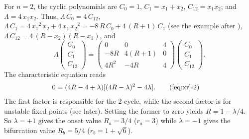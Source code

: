 \documentclass{ws-ijbc}
\begin{document}
For $n = 2$, the cyclic polynomials
  are
$C_0 = 1$,
$C_1 = x_1 + x_2$,
$C_{12} = x_1 x_2$;
and $\Lambda = 4 \, x_1 x_2$.
Thus,
$\Lambda \, C_0 = 4 \, C_{12}$,
$\Lambda \, C_1 = 4 \, {x_1}^2 \, x_2 + 4 \, x_1 \, {x_2}^2
  = -8 \, R \, C_0 + 4 \, (R + 1) \, C_1$
(see the example after ),
$\Lambda \, C_{12}
  = 4 \, (R - x_2) (R - x_1)$,
and
\[
\Lambda
  \left( \begin{array}{c}
  C_0 \\
  C_1 \\
  C_{12}
  \end{array} \right)
 =
  \left( \begin{array}{ccc}
  0           & 0         & 4 \\
  -8R         & 4(R+1)    & 0 \\
  4R^2        & -4R       & 4
  \end{array} \right)
  \left( \begin{array}{c}
  C_0 \\
  C_1 \\
  C_{12}
  \end{array} \right).
\]
%
%
%
The characteristic equation  reads
%
%
%
\begin{align}
0 &= (4R - 4 + \lambda) [(4 R-\lambda)^2 - 4 \lambda].
  \tag{\ref{eq:xr}-2}
\label{eq:xr2}
\end{align}
%
%
%
The first factor is responsible for the 2-cycle,
  while the second factor is for unstable fixed points (see later).
Setting the former to zero yields $R = 1 - \lambda/4$.
So
$\lambda = +1$ gives the onset value $R_a = 3/4$ ($r_a = 3$)
while
$\lambda = -1$ gives the bifurcation value $R_b = 5/4$ ($r_b = 1+\sqrt 6$).
%
\end{document}
